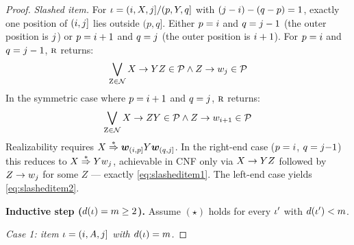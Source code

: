 \documentclass{article}
\begin{document}
\begin{proof}
    \emph{Slashed item.} For ${{ \iota}} = ({{ i}}, X, {{ j}}] / (p, Y, q]$ with $({{ j}} - {{ i}}) - (q - p) = 1$, exactly one position of $({{ i}}, {{ j}}]$ lies outside $(p, q]$. 
    Either $p = {{ i}}$ and $q = {{ j}} - 1$ (the outer position is ${{ j}}$) or $p = {{ i}} + 1$ and $q = {{ j}}$ (the outer position is ${{ i}} + 1$). 
    For $p = {{ i}}$ and $q = {{ j}} - 1$, ${\textsc{r}}$ returns:
    \begin{equation}\label{eq:slasheditem1}
        \bigvee_{{{ \mathrm{Z}}} \in {{ \mathcal{N}}}} {{ X \rightarrow YZ}} \in {{ \mathcal{P}}} \land {{ Z \rightarrow {w}_{{ j}}}} \in {{ \mathcal{P}}}
    \end{equation}
    In the symmetric case where $p = {{ i}} + 1$ and $q = {{ j}}$, ${\textsc{r}}$ returns:
    \begin{equation}\label{eq:slasheditem2}
        \bigvee_{{{ \mathrm{Z}}} \in {{ \mathcal{N}}}}{{ X \rightarrow ZY}} \in {{ \mathcal{P}}} \land {{ Z \rightarrow {w}_{{{ i}}+1}}} \in {{ \mathcal{P}}}
    \end{equation}
    Realizability requires $X \mathrel{{\overset{*}{\Rightarrow}}} {{\boldsymbol{w}}}_{({{ i}}, p]} Y {{\boldsymbol{w}}}_{(q, {{ j}}]}$. 
    In the right-end case ($p = {{ i}}$, $q = {{ j}}{-}1$) this reduces to $X \mathrel{{\overset{*}{\Rightarrow}}} Y {w}_{{ j}}$, achievable in CNF only via ${{ X \rightarrow YZ}}$ followed by ${{ Z \rightarrow {w}_{{ j}}}}$ for some $Z$ --- exactly \cref{eq:slasheditem1}. The left-end case yields \cref{eq:slasheditem2}.
    
    \textbf{Inductive step (${d}({{ \iota}}) = m \ge 2$).} Assume $(\star)$ holds for every ${{ \iota}}'$ with ${d}({{ \iota}}') < m$.
    
    \emph{Case 1: item ${{ \iota}} = ({{ i}}, A, {{ j}}]$ with ${d}({{ \iota}}) = m$.}
    

\end{proof}
\end{document}
